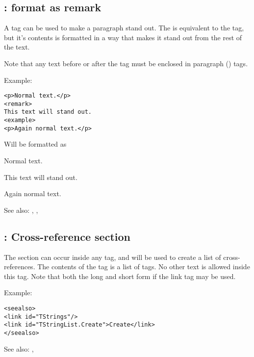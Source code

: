 \subsection{ : format as remark}
\label{tag:remark}
A  tag can be used to make a paragraph stand out. The
 is equivalent to the  tag, but it's contents is
formatted in a way that makes it stand out from the rest of the text.

Note that any text before or after the  tag must be enclosed in
paragraph () tags.

Example:
\begin{verbatim}
<p>Normal text.</p>
<remark>
This text will stand out.
<example>
<p>Again normal text.</p>
\end{verbatim}
Will be formatted as

Normal text.
\begin{remark}
This text will stand out.
\end{remark}
Again normal text.

See also: , , 

\subsection{ : Cross-reference section}
\label{tag:seealso}
The  section can occur inside any  tag, and will
be used to create a list of cross-references. The contents of the
 tag is a list of  tags. No other text is allowed
inside this tag. Note that both the long and short form if the link tag may
be used.

Example:
\begin{verbatim}
<seealso>
<link id="TStrings"/>
<link id="TStringList.Create">Create</link>
</seealso>
\end{verbatim}

See also: , 

